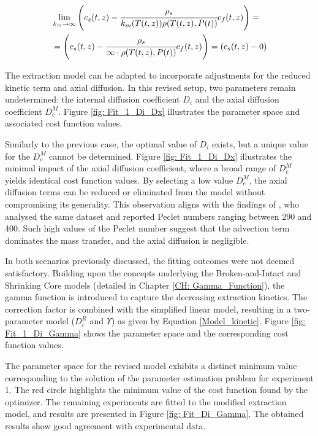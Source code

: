 \documentclass[../Supercritical_fluid_extraction_of_essential_oil_from_chamomile.tex]{subfiles}
\begin{document}
	{\footnotesize
		\begin{equation*}
			\begin{split}
				&\lim_{k_m \rightarrow \infty} \left({\color{black}{\color{black} c_s} }(t,z)  - \cfrac{{\color{black}\rho_s}}{{\color{black}k_m}({\color{black}T}(t,z)){\color{black}\rho}({\color{black}T}(t,z),{\color{black}P}(t))}  {\color{black}c_f}(t,z) \right)  = \\
				&= \left({\color{black}{\color{black} c_s} }(t,z)  - \cfrac{\rho_s}{\infty \cdot \rho(T(t,z),P(t))}  {c_f}(t,z) \right) = \left(c_s(t,z) - 0 \right)
			\end{split}
	\end{equation*} }
	
	The extraction model can be adapted to incorporate adjustments for the reduced kinetic term and axial diffusion. In this revised setup, two parameters remain undetermined: the internal diffusion coefficient $D_i$ and the axial diffusion coefficient $D_e^M$. Figure \ref{fig: Fit_1_Di_Dx} illustrates the parameter space and associated cost function values.
	
	Similarly to the previous case, the optimal value of $D_i$ exists, but a unique value for the $D_e^M$ cannot be determined. Figure \ref{fig: Fit_1_Di_Dx} illustrates the minimal impact of the axial diffusion coefficient, where a broad range of $D_e^M$ yields identical cost function values. By selecting a low value $D_e^M$, the axial diffusion terms can be reduced or eliminated from the model without compromising its generality. This observation aligns with the findings of \citet{Rahimi2011}, who analysed the same dataset and reported Peclet numbers ranging between 290 and 400. Such high values of the Peclet number suggest that the advection term dominates the mass transfer, and the axial diffusion is negligible.
	
	In both scenarios previously discussed, the fitting outcomes were not deemed satisfactory. Building upon the concepts underlying the Broken-and-Intact and Shrinking Core models (detailed in Chapter \ref{CH: Gamma_Function}), the gamma function is introduced to capture the decreasing extraction kinetics. The correction factor is combined with the simplified linear model, resulting in a two-parameter model ($D_i^R$ and $\Upsilon$) as given by Equation \ref{Model_kinetic}. Figure \ref{fig: Fit_1_Di_Gamma} shows the parameter space and the corresponding cost function values.

	The parameter space for the revised model exhibits a distinct minimum value corresponding to the solution of the parameter estimation problem for experiment 1. The red circle highlights the minimum value of the cost function found by the optimizer. The remaining experiments are fitted to the modified extraction model, and results are presented in Figure \ref{fig: Fit_Di_Gamma}. The obtained results show good agreement with experimental data. 
			
\end{document}
